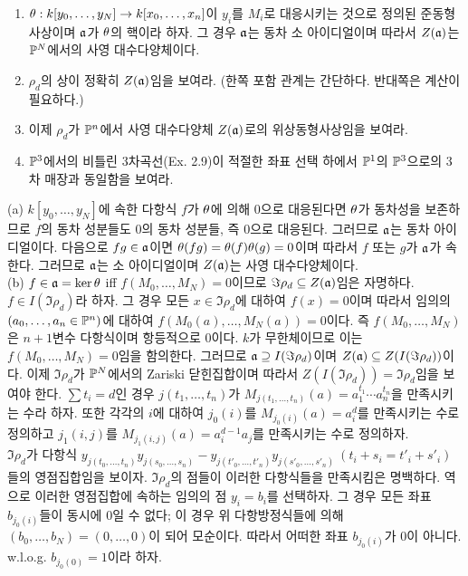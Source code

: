 \begin{enumerate}[label=\tb{2.\arabic*.},itemindent=0mm,itemsep=4mm]
\begin{enumerate}[label=(\alph*)]
			\item $\theta:k[y_0,\ldots,y_N]\rightarrow k[x_0,\ldots,x_n]$이
			$y_i$를 $M_i$로 대응시키는 것으로 정의된 준동형사상이며 $\mathfrak{a}$가 $\theta$의 핵이라 하자.
			그 경우 $\mathfrak{a}$는 동차 소 아이디얼이며 따라서 $Z(\mathfrak{a})$는 $\mathbb{P}^N$에서의 사영 대수다양체이다.
			\item $\rho_d$의 상이 정확히 $Z(\mathfrak{a})$임을 보여라. (한쪽 포함 관계는 간단하다. 반대쪽은 계산이 필요하다.)
			\item 이제 $\rho_d$가 $\mathbb{P}^n$에서 사영 대수다양체 $Z(\mathfrak{a})$로의 위상동형사상임을 보여라.
			\item $\mathbb{P}^3$에서의 비틀린 3차곡선(Ex. 2.9)이 적절한 좌표 선택 하에서
			$\mathbb{P}^1$의 $\mathbb{P}^3$으로의 3차 매장과 동일함을 보여라.
		\end{enumerate}
		\sol (a) $k[y_0,\ldots,y_N]$에 속한 다항식 $f$가 $\theta$에 의해 0으로 대응된다면
		$\theta$가 동차성을 보존하므로 $f$의 동차 성분들도 0의 동차 성분들, 즉 0으로 대응된다. 그러므로 $\mathfrak{a}$는 동차 아이디얼이다.
		다음으로 $fg\in\mathfrak{a}$이면 $\theta(fg)=\theta(f)\theta(g)=0$이며 따라서 $f$ 또는 $g$가 $\mathfrak{a}$가 속한다.
		그러므로 $\mathfrak{a}$는 소 아이디얼이며 $Z(\mathfrak{a})$는 사영 대수다양체이다.\\
		(b) $f\in\mathfrak{a}=\ker\theta$ iff $f(M_0,\ldots,M_N)=0$이므로 $\Im\rho_d\subseteq Z(\mathfrak{a})$임은 자명하다.\\
		$f\in I(\Im\rho_d)$라 하자. 그 경우 모든 $x\in\Im\rho_d$에 대하여 $f(x)=0$이며
		따라서 임의의 $(a_0,\ldots,a_n\in\mathbb{P}^n)$에 대하여 $f(M_0(a),\ldots,M_N(a))=0$이다.
		즉 $f(M_0,\ldots,M_N)$은 $n+1$변수 다항식이며 항등적으로 0이다.
		$k$가 무한체이므로 이는 $f(M_0,\ldots,M_N)=0$임을 함의한다.
		그러므로 $\mathfrak{a}\supseteq I(\Im\rho_d)$이며 $Z(\mathfrak{a})\subseteq Z(I(\Im\rho_d))$이다.
		이제 $\Im\rho_d$가 $\mathbb{P}^N$에서의 Zariski 닫힌집합이며 따라서 $Z(I(\Im\rho_d))=\Im\rho_d$임을 보여야 한다.
		$\sum t_i=d$인 경우 $j(t_1,\ldots,t_n)$가 $M_{j(t_1,\ldots,t_n)}(a)=a_1^{t_1}\cdots a_n^{t_n}$을 만족시키는 수라 하자.
		또한 각각의 $i$에 대하여 $j_0(i)$를 $M_{j_0(i)}(a)=a_i^d$를 만족시키는 수로 정의하고
		$j_1(i,j)$를 $M_{j_1(i,j)}(a)=a_i^{d-1}a_j$를 만족시키는 수로 정의하자.\\
		$\Im\rho_d$가 다항식 $y_{j(t_0,\ldots,t_n)}y_{j(s_0,\ldots,s_n)}-y_{j(t'_0,\ldots,t'_n)}y_{j(s'_0,\ldots,s'_n)}
		\:(t_i+s_i=t'_i+s'_i)$들의 영점집합임을 보이자. $\Im\rho_d$의 점들이 이러한 다항식들을 만족시킴은 명백하다.
		역으로 이러한 영점집합에 속하는 임의의 점 $y_i=b_i$를 선택하자. 그 경우 모든 좌표 $b_{j_0(i)}$들이 동시에 0일 수 없다;
		이 경우 위 다항방정식들에 의해 $(b_0,\ldots,b_N)=(0,\ldots,0)$이 되어 모순이다.
		따라서 어떠한 좌표 $b_{j_0(i)}$가 0이 아니다. w.l.o.g. $b_{j_0(0)}=1$이라 하자.

\end{enumerate}
